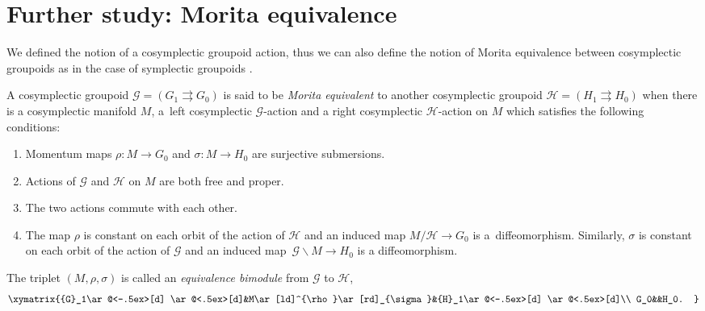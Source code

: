 \documentclass[pdftex]{sigma}
\numberwithin{equation}{section}
\begin{document}
\section{Further study: Morita equivalence}\label{morita}

We defined the notion of a cosymplectic groupoid action, thus we can also define the notion of Morita equivalence between cosymplectic groupoids as in the case of symplectic groupoids \cite{xu2}.

\begin{Definition}
 A cosymplectic groupoid $\mathcal{G}=({G}_1\rightrightarrows G_0)$ is said to be \textit{Morita equivalent} to another cosymplectic groupoid $\mathcal{H}=({H}_1\rightrightarrows H_0)$ when there is a cosymplectic manifold $M$, a~left cosymplectic $\mathcal{G}$-action and a right cosymplectic $\mathcal{H}$-action on $M$ which satisfies the following conditions:
 \begin{enumerate}\itemsep=0pt
 \item[(1)] Momentum maps $\rho\colon M\to G_0$ and $\sigma\colon M\to H_0$ are surjective submersions.

 \item[(2)] Actions of $\mathcal{G}$ and $\mathcal{H}$ on $M$ are both free and proper.

 \item[(3)] The two actions commute with each other.

 \item[(4)] The map $\rho$ is constant on each orbit of the action of $\mathcal{H}$ and an induced map $M/\mathcal{H}\to G_0$ is a~diffeomorphism. Similarly, $\sigma$ is constant on each orbit of the action of $\mathcal{G}$ and an induced map~${\mathcal{G}\backslash M\to H_0}$ is a diffeomorphism.
 \end{enumerate}
 The triplet $(M,\rho,\sigma)$ is called an \textit{equivalence bimodule} from $\mathcal{G}$ to $\mathcal{H}$,
 \[\xymatrix{{G}_1\ar@<-.5ex>[d] \ar@<.5ex>[d]&M\ar[ld]^{\rho}\ar[rd]_{\sigma}&{H}_1\ar@<-.5ex>[d] \ar@<.5ex>[d]\\
 G_0&&H_0.
 }\]
\end{Definition}
\end{document}
